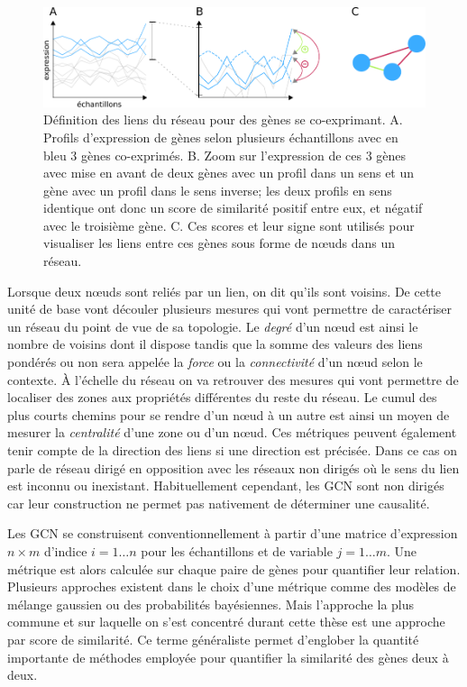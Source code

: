 \begin{figure}[h!]
    \centering
    \includegraphics[width=\textwidth]{img/intro/3_coexpr/intro_3_coexpr_expr_group_sign.pdf}
    \caption[Définition des liens du réseau pour des gènes se co-exprimant.]{Définition des liens du réseau pour des gènes se co-exprimant. A. Profils d'expression de gènes selon plusieurs échantillons avec en bleu 3 gènes co-exprimés. B. Zoom sur l'expression de ces 3 gènes avec mise en avant de deux gènes avec un profil dans un sens et un gène avec un profil dans le sens inverse; les deux profils en sens identique ont donc un score de similarité positif entre eux, et négatif avec le troisième gène. C. Ces scores et leur signe sont utilisés pour visualiser les liens entre ces gènes sous forme de nœuds dans un réseau.}
    \label{fig:coexpr_corr_weight_sign}
\end{figure}

Lorsque deux nœuds sont reliés par un lien, on dit qu'ils sont voisins. De cette unité de base vont découler plusieurs mesures qui vont permettre de caractériser un réseau du point de vue de sa topologie. Le \textit{degré} d'un nœud est ainsi le nombre de voisins dont il dispose tandis que la somme des valeurs des liens pondérés ou non sera appelée la \textit{force} ou la \textit{connectivité} d'un nœud selon le contexte. À l'échelle du réseau on va retrouver des mesures qui vont permettre de localiser des zones aux propriétés différentes du reste du réseau. Le cumul des plus courts chemins pour se rendre d'un nœud à un autre est ainsi un moyen de mesurer la \textit{centralité} d'une zone ou d'un nœud. Ces métriques peuvent également tenir compte de la direction des liens si une direction est précisée. Dans ce cas on parle de réseau dirigé en opposition avec les réseaux non dirigés où le sens du lien est inconnu ou inexistant. Habituellement cependant, les \acrshort{GCN} sont non dirigés car leur construction ne permet pas nativement de déterminer une causalité. 

Les \acrshort{GCN} se construisent conventionnellement à partir d'une matrice d'expression $n \times m$ d'indice $i = 1 … n$ pour les échantillons et de variable $j = 1 … m$. Une métrique est alors calculée sur chaque paire de gènes pour quantifier leur relation. Plusieurs approches existent dans le choix d'une métrique comme des modèles de mélange gaussien ou des probabilités bayésiennes. Mais l'approche la plus commune et sur laquelle on s'est concentré durant cette thèse est une approche par score de similarité. Ce terme généraliste permet d'englober la quantité importante de méthodes employée pour quantifier la similarité des gènes deux à deux. 



